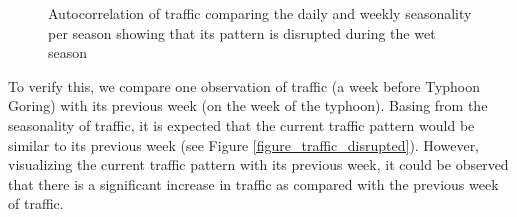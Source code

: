 \begin{figure}[!t] 
\centering
    \centering
      \captionsetup{justification=centering}
    \hfill
    \caption{Autocorrelation of traffic comparing the daily and weekly seasonality per season showing that its pattern is disrupted during the wet season}
    \label{figure_autocorr_traffic_season}
\end{figure}




To verify this, we compare one observation of traffic (a week before Typhoon Goring) with its previous week (on the week of the typhoon). Basing from the seasonality of traffic, it is expected that the current traffic pattern would be similar to its previous week (see Figure \ref{figure_traffic_disrupted}). However, visualizing the current traffic pattern with its previous week, it could be observed that there is a significant increase in traffic as compared with the previous week of traffic.

